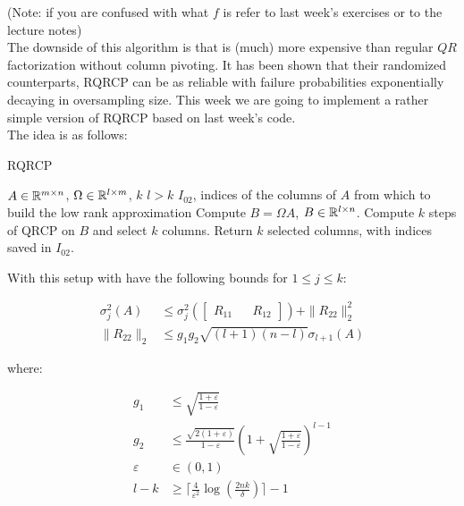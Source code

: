 \documentclass[11pt]{article}
\begin{document}
(Note: if you are confused with what $f$ is refer to last week's exercises or to the lecture notes) \\

The downside of this algorithm is that is (much) more expensive than regular $QR$ factorization without column pivoting. It has been shown that their randomized counterparts, RQRCP can be as reliable with failure probabilities exponentially decaying in oversampling size. This week we are going to implement a rather simple version of RQRCP based on last week's code. \\

The idea is as follows:

\scriptsize
\begin{algorithm}
\caption{RQRCP}\label{RQRCP}
\begin{algorithmic}
\Input $A \in \mathbb{R}^{m \times n}$, $\Omega \in \mathbb{R}^{l \times m}$, $k$ $l > k$
\Output $I_{02}$, indices of the columns of $A$ from which to build the low rank approximation
\State Compute $B = \Omega A$, $B \in \mathbb{R}^{l \times n}$.
\State Compute $k$ steps of QRCP on $B$ and select $k$ columns.
\State Return $k$ selected columns, with indices saved in $I_{02}$.
\end{algorithmic}
\end{algorithm}
\normalsize

With this setup with have the following bounds for $1 \leq j \leq k$:

\begin{align}
\sigma_{j}^2(A) & \leq \sigma_{j}^2\left( \begin{bmatrix} R_{11} && R_{12} \end{bmatrix} \right) + \|R_{22} \|_2^2 \label{bound: 1 RQRCP} \\
\|R_{22}\|_2 & \leq g_{1} g_{2} \sqrt{(l + 1)(n-l)} \sigma_{l + 1}(A) \label{bound: 2 RQRCP}
\end{align}

where:

\begin{align*}
g_{1} &\leq \sqrt{ \frac{1 + \varepsilon}{1 - \varepsilon} } \\
g_{2} &\leq \frac{\sqrt{2(1 + \varepsilon)}}{1 - \varepsilon}\left( 1 + \sqrt{ \frac{1 + \varepsilon}{1 - \varepsilon} } \right)^{l-1} \\
\varepsilon &\in (0,1) \\
l-k &\geq \lceil \frac{4}{\varepsilon^2} \log\left(\frac{2nk}{\delta}\right) \rceil - 1
\end{align*}
\end{document}
